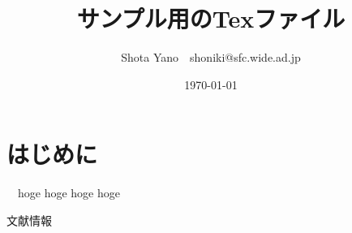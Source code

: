 \documentclass[twocolumn, a4j]{article}
\title{サンプル用のTexファイル}
\author{Shota Yano\footnotemark[2]　shoniki@sfc.wide.ad.jp}
\date{\today}
\renewcommand{\thefootnote}{\fnsymbol{footnote}}
\renewcommand{\thefootnote}{\arabic{footnote}}
\begin{document}

\renewcommand{\thefootnote}{\fnsymbol{footnote}}
\renewcommand{\thefootnote}{\arabic{footnote}}
\section{はじめに}

  　hoge hoge hoge hoge

\renewcommand{\refname}{参考文献}
\begin{thebibliography}{数字}
   文献情報
\end{thebibliography}
\end{document}
